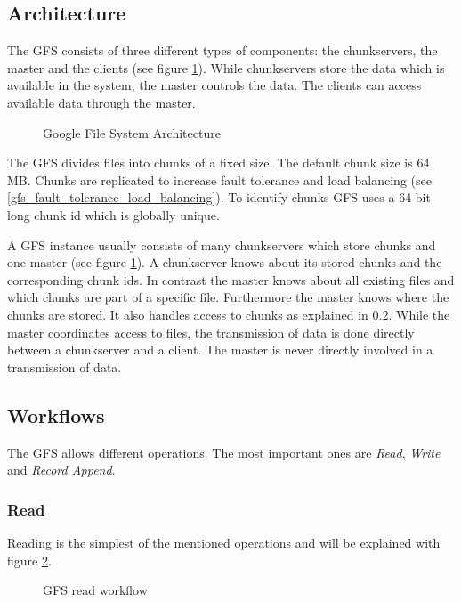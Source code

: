 \documentclass{sig-alternate}
\begin{document}
\subsection{Architecture}
The GFS consists of three different types of components: the chunkservers, the master and the clients (see figure \ref{fig:gfs_architecture}). While chunkservers store the data which is available in the system, the master controls the data. The clients can access available data through the master.

\begin{figure}[!hbt]
\centering
{}
\caption{Google File System Architecture}
\label{fig:gfs_architecture}
\end{figure}

The GFS divides files into chunks of a fixed size. The default chunk size is 64 MB.
Chunks are replicated to increase fault tolerance and load balancing (see \ref{gfs_fault_tolerance_load_balancing}). To identify chunks GFS uses a 64 bit long chunk id which is globally unique.~\cite{google1}

A GFS instance usually consists of many chunkservers which store chunks and one master (see figure \ref{fig:gfs_architecture}). A chunkserver knows about its stored chunks and the corresponding chunk ids. In contrast the master knows about all existing files and which chunks are part of a specific file. Furthermore the master knows where the chunks are stored. It also handles access to chunks as explained in \ref{gfs_workflows}. While the master coordinates access to files, the transmission of data is done directly between a chunkserver and a client. The master is never directly involved in a transmission of data.

\subsection{Workflows}
\label{gfs_workflows}
The GFS allows different operations. The most important ones are \textit{Read}, \textit{Write} and \textit{Record Append}.

\subsubsection{Read}
Reading is the simplest of the mentioned operations and will be explained with figure \ref{fig:gfs_read}.

\begin{figure}[!hbt]
\centering
{}
\caption{GFS read workflow}
\label{fig:gfs_read}
\end{figure}
\end{document}
